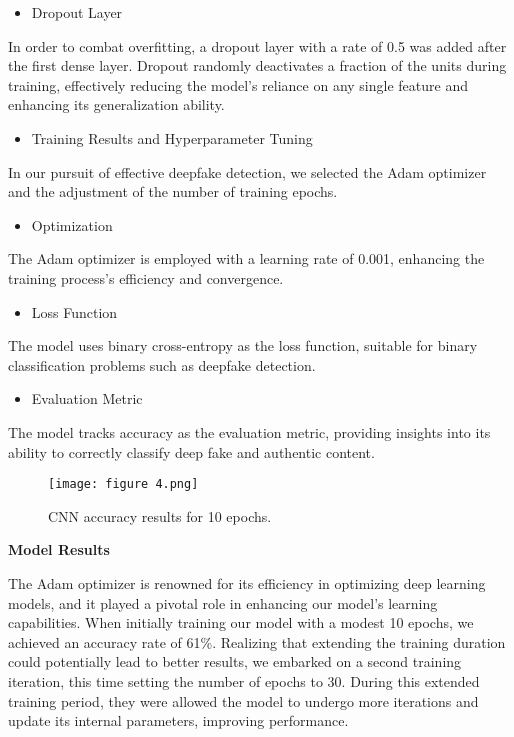\documentclass{article}
\begin{document}
\begin{itemize}
    \item Dropout Layer
\end{itemize}
In order to combat overfitting, a dropout layer with a rate of 0.5 was added after the first dense layer. Dropout randomly deactivates a fraction of the units during training, effectively reducing the model's reliance on any single feature and enhancing its generalization ability.

\begin{itemize}
    \item Training Results and Hyperparameter Tuning
\end{itemize}
In our pursuit of effective deepfake detection, we selected the Adam optimizer and the adjustment of the number of training epochs.

\begin{itemize}
    \item Optimization
\end{itemize}
The Adam optimizer is employed with a learning rate of 0.001, enhancing the training process's efficiency and convergence.

\begin{itemize}
    \item Loss Function
\end{itemize}
 The model uses binary cross-entropy as the loss function, suitable for binary classification problems such as deepfake detection.

\begin{itemize}
    \item Evaluation Metric
\end{itemize}
The model tracks accuracy as the evaluation metric, providing insights into its ability to correctly classify deep fake and authentic content.
\begin{figure}
    \centering
    \texttt{[image: figure 4.png]}
    \caption{CNN accuracy results for 10 epochs. }
    \label{fig:enter-label}
\end{figure}
\textbf{Model Results}

The Adam optimizer is renowned for its efficiency in optimizing deep learning models, and it played a pivotal role in enhancing our model's learning capabilities. When initially training our model with a modest 10 epochs, we achieved an accuracy rate of 61\%.
Realizing that extending the training duration could potentially lead to better results, we embarked on a second training iteration, this time setting the number of epochs to 30. During this extended training period, they were allowed the model to undergo more iterations and update its internal parameters, improving performance.
\end{document}
